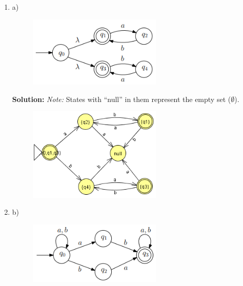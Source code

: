 \documentclass[12pt]{article}
\begin{document}
\begin{spacing}{1.5}
\begin{enumerate}
                  \begin{enumerate}
                        \item[] a)
                              \begin{figure}[h!]
                                    \centering
                                    \includegraphics[width=0.6\textwidth]{img/q2/question2a.png}
                              \end{figure}

                              \textbf{Solution:} \textit{Note:} States with ``null'' in them represent the empty set ($\emptyset$).

                              \begin{figure}[h!]
                                    \centering
                                    \includegraphics[width=0.6\textwidth]{img/q2/q2a.png}
                              \end{figure}

                              \newpage

                        \item[] b)
                              \begin{figure}[h!]
                                    \centering
                                    \includegraphics[width=0.6\textwidth]{img/q2/question2b.png}
                              \end{figure}


\end{enumerate}
\end{enumerate}
\end{spacing}
\end{document}
